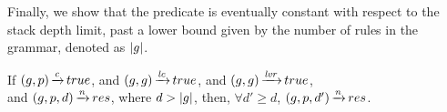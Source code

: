 Finally, we show that the predicate is
eventually constant
with respect to the stack depth limit,
past a lower bound given by the number of rules in the grammar,
denoted as $|g|$.

\begin{lemma}%
    If $(g,p) \operatorname{\xrightarrow{\mathit{c}}} true$,
    and $(g,g) \operatorname{\xrightarrow{\mathit{lc}}} true$,
    and $(g,g) \operatorname{\xrightarrow{\mathit{lvr}}} true$, \\
    and $(g,p,d) \operatorname{\xrightarrow{\mathit{n}}} res$,
    where $d > |g|$,
    then, $\forall d' \ge d$,
    $(g,p,d') \operatorname{\xrightarrow{\mathit{n}}} res$.
\end{lemma}
